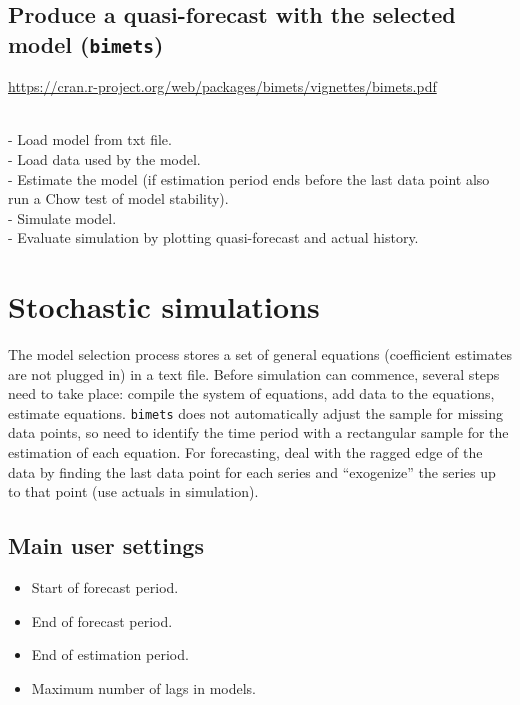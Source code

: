 \documentclass[
  letterpaper,
  DIV=11,
  numbers=noendperiod]{scrreport}
\providecommand{\tightlist}{%
  \setlength{\itemsep}{0pt}\setlength{\parskip}{0pt}}\usepackage{longtable,booktabs,array}
\begin{document}
\section{\texorpdfstring{Produce a quasi-forecast with the selected
model
(\texttt{bimets})}{Produce a quasi-forecast with the selected model (bimets)}}\label{produce-a-quasi-forecast-with-the-selected-model-bimets}

\url{https://cran.r-project.org/web/packages/bimets/vignettes/bimets.pdf}\strut \\
- Load model from txt file.\\
- Load data used by the model.\\
- Estimate the model (if estimation period ends before the last data
point also run a Chow test of model stability).\\
- Simulate model.\\
- Evaluate simulation by plotting quasi-forecast and actual history.


\chapter{Stochastic simulations}\label{stochastic-simulations}

The model selection process stores a set of general equations
(coefficient estimates are not plugged in) in a text file. Before
simulation can commence, several steps need to take place: compile the
system of equations, add data to the equations, estimate equations.
\texttt{bimets} does not automatically adjust the sample for missing
data points, so need to identify the time period with a rectangular
sample for the estimation of each equation. For forecasting, deal with
the ragged edge of the data by finding the last data point for each
series and ``exogenize'' the series up to that point (use actuals in
simulation).

\section{Main user settings}\label{main-user-settings-1}

\begin{itemize}
\tightlist
\item
  Start of forecast period.\\
\item
  End of forecast period.\\
\item
  End of estimation period.\\
\item
  Maximum number of lags in models.
\end{itemize}
\end{document}
